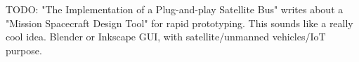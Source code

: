 TODO: "The Implementation of a Plug-and-play Satellite Bus" writes about a
"Mission Spacecraft Design Tool" for rapid prototyping. This sounds like a
really cool idea. Blender or Inkscape GUI, with satellite/unmanned vehicles/IoT
purpose.

